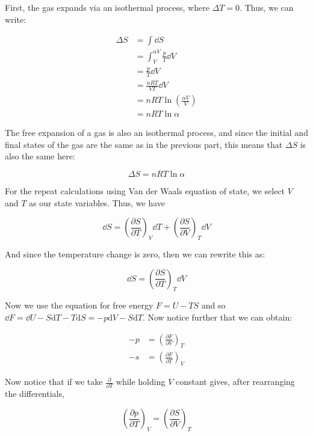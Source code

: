 \documentclass[10pt]{article}
\begin{document}
\begin{solution}
    First, the gas expands via an isothermal process, where $\Delta T = 0$. Thus, we can write:

    \begin{align*}
         \Delta S &= \int \dd S\\
         &= \int_{V}^{\alpha V} \frac{p}{T} \dd V \\
         &= \frac{p}{T} \dd V\\
         &= \frac{nRT}{VT} \dd V\\
         &= nRT \ln \left(\frac{\alpha V}{V}\right)\\
         &= nRT \ln \alpha
    \end{align*}

    The free expansion of a gas is also an isothermal process, and since the initial and final states of the gas are the same as in the previous part, this means that $\Delta S$ is also the same here:

    \[ \Delta S = nRT \ln \alpha\]

    For the repeat calculations using Van der Waals equation of state, we select $V$ and $T$ as our state variables. Thus, we have

    \[ \dd S = \left(\frac{\partial S}{\partial T}\right)_V \dd T + \left(\frac{\partial S}{\partial V}\right)_T \dd V\]

    And since the temperature change is zero, then we can rewrite this as:

    \begin{equation}\label{entropy}
        \dd S = \left(\frac{\partial S}{\partial T}\right)_T \dd V
    \end{equation}

    Now we use the equation for free energy $F = U - TS$ and so $\dd F = \dd U - S \mathrm{d} T - T \mathrm{d} S = -p \mathrm{d} V - S \mathrm{d}T$. Now notice further that we can obtain:

    \begin{align*}
        -p &= \left(\frac{\partial F}{\partial V}\right)_T \\
        -s &= \left(\frac{\partial F}{\partial T}\right)_V
    \end{align*}

    Now notice that if we take $\frac{\partial}{\partial T}$ while holding $V$ constant gives, after rearranging the differentials, 

    \[ \left(\frac{\partial p}{\partial T}\right)_V = \left(\frac{\partial S}{\partial V}\right)_T\]


\end{solution}
\end{document}

